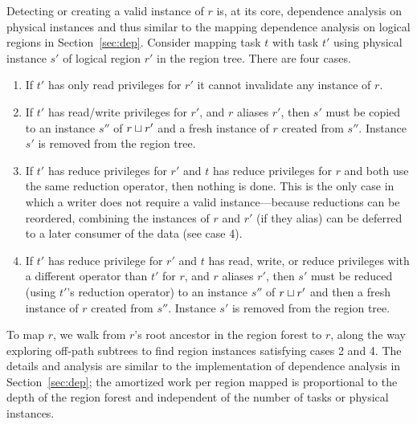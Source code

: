 Detecting or creating a valid instance of $r$ is, at its core, dependence analysis on
physical instances and thus similar to the mapping dependence analysis on logical
regions in Section~\ref{sec:dep}.  Consider mapping task $t$ with task $t'$ using
physical instance $s'$ of logical region $r'$ in the region tree.  There are four cases.
\begin{enumerate}
\item If $t'$ has only read privileges
for $r'$ it cannot invalidate any instance of $r$.

\item If $t'$ has read/write privileges for $r'$, and $r$ aliases $r'$,
   then $s'$ must be copied to an instance $s''$ of
  $r \sqcup r'$ and a fresh instance of $r$ created from $s''$.
Instance $s'$ is removed from the region tree.

\item If $t'$ has reduce privileges for $r'$ and $t$ has reduce
  privileges for $r$ and both use the same reduction operator, then
  nothing is done.  This is the only case in which a writer
  does not require a valid instance---because reductions can be
  reordered, combining the instances of $r$ and $r'$ (if they
  alias) can be deferred to a later consumer of the data (see case
  4).

\item If $t'$ has reduce privilege for $r'$ and $t$ has read, write, 
  or reduce privileges with a different operator than $t'$
  for $r$, and $r$ aliases $r'$, then $s'$ must be
  reduced (using $t'$'s reduction operator) to an instance $s''$ of
  $r \sqcup r'$ and then a fresh instance of $r$ created from $s''$.
Instance $s'$ is removed from the region
  tree.
\end{enumerate}

To map $r$, we walk from $r$'s
root ancestor in the region forest to $r$, along the way exploring
off-path subtrees to find region instances satisfying cases 2 and
4. The details and analysis are similar to the implementation of dependence
analysis in Section~\ref{sec:dep}; the amortized work per region mapped
is proportional to the depth of the region forest and independent of
the number of tasks or physical instances.

